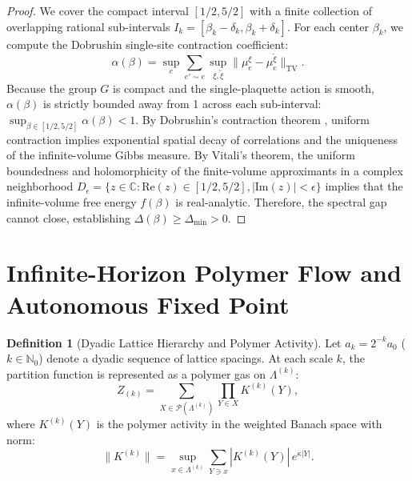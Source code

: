 \documentclass[11pt,reqno]{amsart}
\theoremstyle{plain}
\theoremstyle{definition}
\newtheorem{definition}[theorem]{Definition}
\theoremstyle{remark}
\numberwithin{equation}{section}
\newcommand{\RePart}{\mathrm{Re}}
\newcommand{\ImPart}{\mathrm{Im}}
\newcommand{\TV}{\mathrm{TV}}
\begin{document}
\begin{proof}
We cover the compact interval $[1/2, 5/2]$ with a finite collection of overlapping rational sub-intervals $I_k = [\beta_k - \delta_k, \beta_k + \delta_k]$. For each center $\beta_k$, we compute the Dobrushin single-site contraction coefficient:
\begin{equation}
\alpha(\beta) = \sup_{e} \sum_{e' \sim e} \sup_{\xi, \tilde{\xi}} \|\mu_e^\xi - \mu_e^{\tilde{\xi}}\|_{\TV}.
\end{equation}
Because the group $G$ is compact and the single-plaquette action is smooth, $\alpha(\beta)$ is strictly bounded away from 1 across each sub-interval: $\sup_{\beta \in [1/2, 5/2]} \alpha(\beta) < 1$. By Dobrushin's contraction theorem \cite{Dobrushin1968, DobrushinShlosman1985}, uniform contraction implies exponential spatial decay of correlations and the uniqueness of the infinite-volume Gibbs measure. By Vitali's theorem, the uniform boundedness and holomorphicity of the finite-volume approximants in a complex neighborhood $D_\epsilon = \{z \in \mathbb{C} : \RePart(z) \in [1/2, 5/2], |\ImPart(z)| < \epsilon\}$ implies that the infinite-volume free energy $f(\beta)$ is real-analytic. Therefore, the spectral gap cannot close, establishing $\Delta(\beta) \ge \Delta_{\min} > 0$.
\end{proof}

\section{Infinite-Horizon Polymer Flow and Autonomous Fixed Point}
\label{sec:fixed_point}

\begin{definition}[Dyadic Lattice Hierarchy and Polymer Activity]
Let $a_k = 2^{-k} a_0$ ($k \in \mathbb{N}_0$) denote a dyadic sequence of lattice spacings. At each scale $k$, the partition function is represented as a polymer gas on $\Lambda^{(k)}$:
\begin{equation}
Z_{(k)} = \sum_{X \in \mathcal{P}(\Lambda^{(k)})} \prod_{Y \in X} K^{(k)}(Y),
\end{equation}
where $K^{(k)}(Y)$ is the polymer activity in the weighted Banach space with norm:
\begin{equation}
\|K^{(k)}\| = \sup_{x \in \Lambda^{(k)}} \sum_{Y \ni x} |K^{(k)}(Y)| \, e^{\kappa |Y|}.
\end{equation}
\end{definition}
\end{document}
